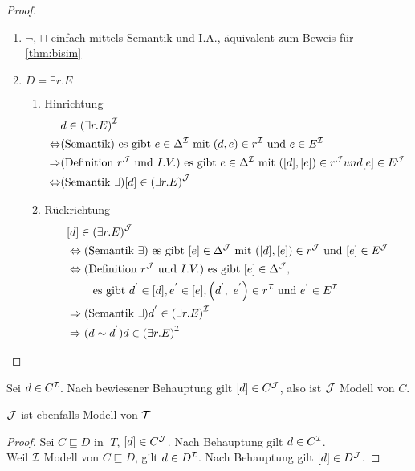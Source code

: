 \begin{tafel}
\begin{proof}
\begin{enumerate}
    \item $\neg$, $\sqcap$ einfach mittels Semantik und I.A., äquivalent zum Beweis für \autoref{thm:bisim}
\item $D = \exists r.E$
  \begin{enumerate}
  \def\labelenumi{\alph{enumi}.}
  \def\labelenumii{\alph{enumii}.}
  \item Hinrichtung
      \begin{align*}
          &d \in \left( \exists r.E \right)^\MI\\
          \Leftrightarrow &(\text{Semantik})\text{ es gibt }e \in \Delta^\MI \text{ mit } \left( d,e \right) \in r^\MI \text{ und } e \in E^\MI \\
          \Rightarrow &(\text{Definition }r^{\MJ} \text{ und } I.V.) \text{ es gibt }e \in \Delta^\MI \text{ mit }\left( \left\lbrack d \right\rbrack,\left\lbrack e \right\rbrack \right) \in r^{\MJ} und \left\lbrack e \right\rbrack \in E^{\MJ} \\
          \Leftrightarrow &(\text{Semantik } \exists) \left\lbrack d \right\rbrack \in \left( \exists r.E \right)^{\MJ}
      \end{align*}
    \item Rückrichtung
        \begin{align*}
            &\left\lbrack d \right\rbrack \in \left( \exists r.E \right)^{\MJ} \\
            &\Leftrightarrow (\text{Semantik }\exists) \text{ es gibt }[e] \in \Delta^{\MJ} \text{ mit } \left( \left\lbrack d \right\rbrack,\left\lbrack e \right\rbrack \right) \in r^{\MJ}\text{ und }\left\lbrack e \right\rbrack \in E^{\MJ} \\
            &\Leftrightarrow (\text{Definition }r^{\MJ} \text{ und }I.V.) \text{ es gibt }[e] \in \Delta^{\MJ},\\
            &\quad\quad\text{ es gibt }d^{'} \in \left\lbrack d \right\rbrack, e^{'} \in \left\lbrack e \right\rbrack, \left( d^{'},\ e^{'} \right) \in r^\MI \text{ und }e^{'} \in E^\MI \\
            &\Rightarrow (\text{Semantik }\exists) d^{'} \in \left( \exists r.E \right)^\MI \\
            &\Rightarrow (d \sim d^{'}) d \in \left( \exists r.E \right)^\MI
        \end{align*}
\end{enumerate}
\end{enumerate}
\end{proof}
Sei $d \in C^{\mathcal{I}}$. Nach bewiesener Behauptung gilt $[d] \in C^{\mathcal{J}}$, also ist $\mathcal{J}$ Modell von $C$.

$\mathcal{J}$ ist ebenfalls Modell von $\mathcal{T}$
\begin{proof}
Sei $C \sqsubseteq D$ in $\;T$, $[d] \in C^{\mathcal{J}}$.
Nach Behauptung gilt $d \in C^{\mathcal{I}}$. \\
Weil $\mathcal{I}$ Modell von $C \sqsubseteq D$, gilt $d \in D^{\mathcal{I}}$.
Nach Behauptung gilt $[d] \in D^{\mathcal{J}}$.
\end{proof}
\end{tafel}

